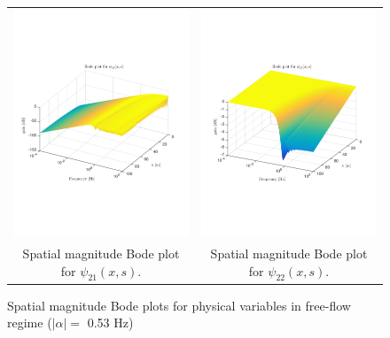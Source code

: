 \documentclass[preprint]{elsarticle}
\begin{document}
\begin{figure}
\begin{tabular}{cc}
\tabularnewline
\includegraphics[trim = 0mm 60mm 0mm 60mm, width = 8cm]{distr_psi_21}
&
\includegraphics[trim = 0mm 60mm 0mm 60mm, width = 8cm]{distr_psi_22}
\tabularnewline
Spatial magnitude Bode plot for $\psi_{21}(x,s)$.
&
Spatial magnitude Bode plot for $\psi_{22}(x,s)$.
\tabularnewline
\end{tabular}
\caption{Spatial magnitude Bode plots for physical variables in free-flow regime ($\left|\alpha\right| = $ 0.53 Hz)\label{fig:Magn_spatial_physx}}
\end{figure}

\end{document}
